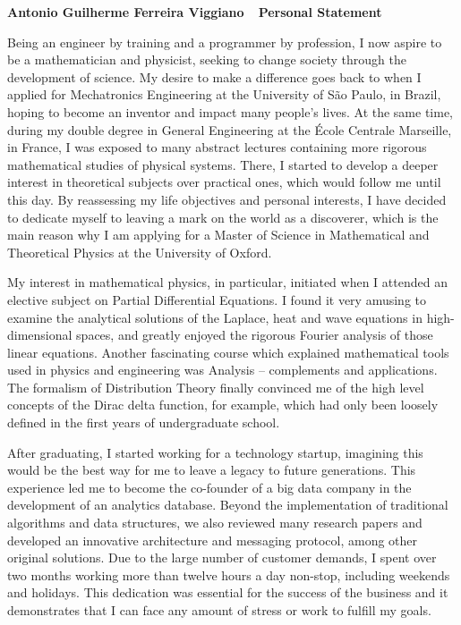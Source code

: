 \documentclass[10pt]{article}
\def\firstname{Antonio Guilherme }
\def\familyname{Ferreira Viggiano}
\def\subj{Personal Statement}
\def\FileTitle{\firstname\familyname~\textemdash~\subj}
\begin{document}
\sffamily %

{\bfseries \FileTitle}



Being an engineer by training and a programmer by profession, I now aspire to be a mathematician and physicist, seeking to change society through the development of science. My desire to make a difference goes back to when I applied for Mechatronics Engineering at the University of São Paulo, in Brazil, hoping to become an inventor and impact many people's lives. At the same time, during my double degree in General Engineering at the École Centrale Marseille, in France, I was exposed to many abstract lectures containing more rigorous mathematical studies of physical systems. There, I started to develop a deeper interest in theoretical subjects over practical ones, which would follow me until this day. By reassessing my life objectives and personal interests, I have decided to dedicate myself to leaving a mark on the world as a discoverer, which is the main reason why I am applying for a Master of Science in Mathematical and Theoretical Physics at the University of Oxford.

My interest in mathematical physics, in particular, initiated when I attended an elective subject on Partial Differential Equations. I found it very amusing to examine the analytical solutions of the Laplace, heat and wave equations in high-dimensional spaces, and greatly enjoyed the rigorous Fourier analysis of those linear equations. Another fascinating course which explained mathematical tools used in physics and engineering was Analysis -- complements and applications. The formalism of Distribution Theory finally convinced me of the high level concepts of the Dirac delta function, for example, which had only been loosely defined in the first years of undergraduate school.

After graduating, I started working for a technology startup, imagining this would be the best way for me to leave a legacy to future generations. This experience led me to become the co-founder of a big data company in the development of an analytics database. Beyond the implementation of traditional algorithms and data structures, we also reviewed many research papers and developed an innovative architecture and messaging protocol, among other original solutions. Due to the large number of customer demands, I spent over two months working more than twelve hours a day non-stop, including weekends and holidays. This dedication was essential for the success of the business and it demonstrates that I can face any amount of stress or work to fulfill my goals.
\end{document}
